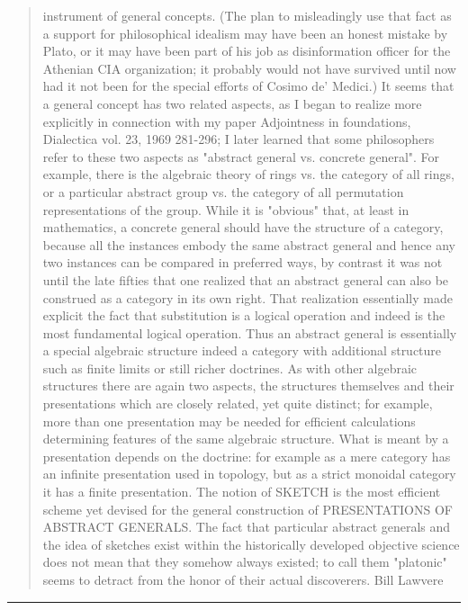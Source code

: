 \begin{quote}
instrument of general concepts. (The plan to misleadingly use that fact as
a support for philosophical idealism may have been an honest mistake by
Plato, or it may have been part of his job as disinformation officer for
the Athenian CIA organization; it probably would not have survived until
now had it not been for the special efforts of Cosimo de' Medici.)
It seems that a general concept has two related aspects, as I began to
realize more explicitly in connection with my paper Adjointness in
foundations, Dialectica vol. 23, 1969 281-296;  I later learned that
some philosophers refer to these two aspects as
"abstract general vs. concrete general".  For example, there is the
algebraic theory of rings  vs. the category of all rings, or
a particular abstract group  vs. the category of all permutation
representations of the group.  While it is "obvious" that, at least in
mathematics, a concrete general should have the structure of a category,
because all the instances embody the same abstract general and hence
any two instances can be compared in preferred ways, by contrast it was
not until the late fifties that one realized that an abstract general can
also be construed as a category in its own right. That realization
essentially made explicit the fact that substitution is a logical
operation and indeed is the most fundamental logical operation.
     Thus an abstract general is essentially a special algebraic structure
indeed a category with additional structure such as finite limits or
still richer doctrines.  As with other algebraic structures there are
again two aspects, the structures themselves and their presentations which
are closely related, yet quite distinct;  for example, more than one
presentation may be needed for efficient calculations determining features
of the same algebraic structure. What is meant by a presentation depends 
on the doctrine: for example \Delta  as a mere category has an infinite
presentation used in topology, but as a strict monoidal category it has
a finite presentation.
     The notion of SKETCH is the most efficient scheme yet devised for the
general construction of PRESENTATIONS OF ABSTRACT GENERALS. The fact that
particular abstract generals and the idea of sketches exist within the
historically developed objective science does not mean that they somehow
always existed; to call them "platonic" seems to detract from the honor of
their actual discoverers.
     Bill Lawvere
\end{quote}



 \par\noindent\rule{\textwidth}{0.4pt}

